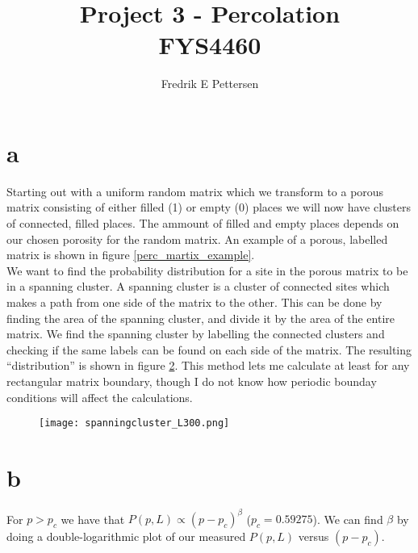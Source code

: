 \documentclass[a4paper,english, 10pt, twoside]{article}
\title{Project 3 - Percolation \\ FYS4460}
\author{Fredrik E Pettersen}
\begin{document}
 
 \maketitle
 \section*{a}
 Starting out with a uniform random matrix which we transform to a porous matrix consisting of
 either filled (1) or empty (0) places we will now have clusters of connected, filled places. 
 The ammount of filled and empty places depends on our chosen porosity for the random matrix. 
 An example of a porous, labelled matrix is shown in figure \ref{perc_martix_example}.\\
We want to find the probability distribution for a site in the porous matrix to be in a spanning cluster. A 
spanning cluster is a cluster of connected sites which makes a path from one side of the matrix
to the other. This can be done by finding the area of the spanning cluster, and divide it by
the area of the entire matrix. We find the spanning cluster by labelling the connected clusters 
and checking if the same labels can be found on each side of the matrix. The resulting ``distribution'' 
is shown in figure \ref{P(p,L)}.
This method lets me calculate at least for any rectangular matrix boundary, though I do not know how periodic
bounday conditions will affect the calculations.

\begin{figure}[H]
\centering
\label{perc_matrix_example}
\end{figure}

\begin{figure}[H]
\centering
 \texttt{[image: spanningcluster\_L300.png]}
 \label{P(p,L)}
\end{figure}

\section*{b}
For $p>p_c$ we have that $P(p,L) \propto (p-p_c)^\beta$ ($p_c = 0.59275$). We can find $\beta$ by doing 
a double-logarithmic plot of our measured $P(p,L)$ versus $(p-p_c)$.
\end{document}
